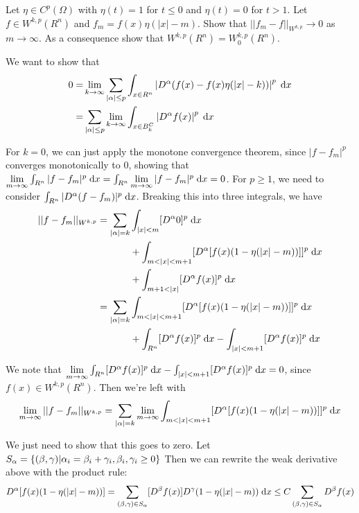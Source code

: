 Let $\eta \in C^p(\Omega)$ with $\eta(t) = 1$ for $t \leq 0$ and $\eta(t) = 0$ for $t > 1$.
Let $f \in W^{k, p}(R^n)$ and $f_m = f(x) \eta(|x| - m)$.
Show that $||f_m - f||_{W^{k, p}} \rightarrow 0$ as $m \rightarrow \infty$.
As a consequence show that $W^{k, p}(R^n) = W_0^{k, p}(R^n)$.

We want to show that
\begin{align*}
0 = &\lim_{k \rightarrow \infty} \sum_{|\alpha| \leq p} \int_{x \in R^n} \left| D^\alpha (f(x) - f(x) \eta(|x| - k)) \right|^p \;\mathrm{d}x\\
  = &\sum_{|\alpha| \leq p} \lim_{k \rightarrow \infty} \int_{x \in B_k^C} \left| D^\alpha f(x) \right|^p \;\mathrm{d}x
\end{align*}

For $k = 0$, we can just apply the monotone convergence theorem,
since $|f - f_m|^p$ converges monotonically to $0$, showing that
$\lim \limits_{m \rightarrow \infty} \int_{R^n} |f - f_m|^p \;\mathrm{d}x = \int_{R^n} \lim \limits_{m \rightarrow \infty} |f - f_m|^p \;\mathrm{d}x = 0$.
For $p \geq 1$, we need to consider $\int_{R^n} |D^\alpha (f - f_m)|^p \;\mathrm{d}x$.
Breaking this into three integrals, we have
\begin{align*}
||f - f_m||_{W^{k, p}} = \sum_{|\alpha| = k} &\int_{|x| < m} [D^\alpha 0]^p \;\mathrm{d}x\\
                                        &+ \int_{m < |x| < m + 1} [D^\alpha [f(x) (1 - \eta(|x| - m))]]^p \;\mathrm{d}x\\
                                        &+ \int_{m + 1 < |x|} [D^\alpha f(x)]^p \;\mathrm{d}x\\
                     = \sum_{|\alpha| = k} &\int_{m < |x| < m + 1} [D^\alpha [f(x) (1 - \eta(|x| - m))]]^p \;\mathrm{d}x\\
                                        &+ \int_{R^n} [D^\alpha f(x)]^p \;\mathrm{d}x - \int_{|x| < m + 1} [D^\alpha f(x)]^p \;\mathrm{d}x
\end{align*}

We note that $\lim \limits_{m \rightarrow \infty} \int_{R^n} [D^\alpha f(x)]^p \;\mathrm{d}x - \int_{|x| < m + 1} [D^\alpha f(x)]^p \;\mathrm{d}x = 0$,
since $f(x) \in W^{k, p}(R^n)$.
Then we're left with
\begin{align*}
\lim \limits_{m \rightarrow \infty} ||f - f_m||_{W^{k, p}}
  = \sum_{|\alpha| = k} \lim \limits_{m \rightarrow \infty} \int_{m < |x| < m + 1} [D^\alpha [f(x) (1 - \eta(|x| - m))]]^p \;\mathrm{d}x
\end{align*}

We just need to show that this goes to zero.
Let $S_\alpha = \{ (\beta, \gamma) | \alpha_i = \beta_i + \gamma_i, \beta_i, \gamma_i \geq 0 \}$
Then we can rewrite the weak derivative above with the product rule:
$$
D^\alpha [f(x) (1 - \eta(|x| - m))]
  = \sum_{(\beta, \gamma) \in S_\alpha} [D^\beta f(x)] D^{\gamma}(1 - \eta(|x| - m)) \;\mathrm{d}x
  \leq C \sum_{(\beta, \gamma) \in S_\alpha} D^\beta f(x)
$$

